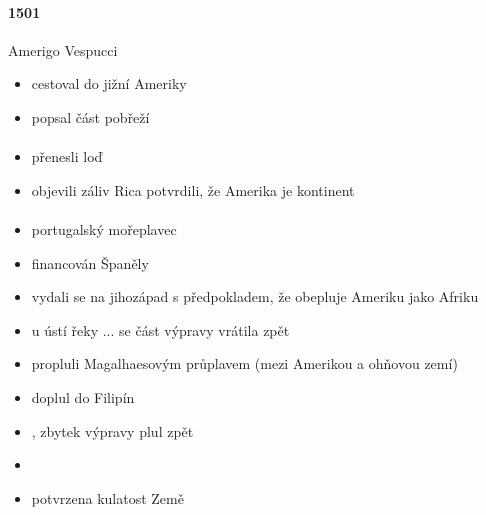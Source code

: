 \paragraph{1501}{Amerigo Vespucci}
\begin{itemize}
\item cestoval do jižní Ameriky
\item popsal část pobřeží
\end{itemize}

\paragraph{}
\begin{itemize}
\item přenesli loď
\item objevili záliv Rica \ra potvrdili, že Amerika je kontinent
\end{itemize}

\paragraph{}
\begin{itemize}
\item portugalský mořeplavec
\item financován Španěly
\item vydali se na jihozápad s předpokladem, že obepluje Ameriku jako Afriku
\item u ústí řeky ... se část výpravy vrátila zpět
\item propluli Magalhaesovým průplavem (mezi Amerikou a ohňovou zemí)
\item doplul do Filipín
\item {}, zbytek výpravy plul zpět
\item {}
\item[\ra] potvrzena kulatost Země
\end{itemize}
